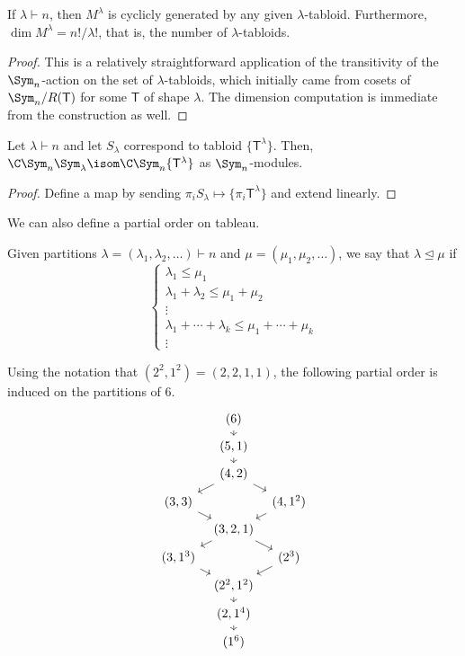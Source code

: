 \documentclass[11pt,leqno,oneside]{amsbook}
\newcommand{\partitionof}{\vdash}
\newcommand{\T}{\mathsf{T}} %
\newcommand{\dominatedby}{\trianglelefteq}
\numberwithin{thm}{section}
\begin{document}
\begin{prop}
  If \(\lambda \partitionof n\), then \(M^\lambda\) is cyclicly
  generated by any given \(\lambda\)-tabloid. Furthermore, \(\dim
  M^\lambda = n!/\lambda!\), that is, the number of \(\lambda\)-tabloids.
\end{prop}
\begin{proof}
  This is a relatively straightforward application of the
  transitivity of the \(\Sym_n\)-action on the set of
  \(\lambda\)-tabloids, which 
  initially came from cosets of \(\Sym_n/R(\T)\) for some \(\T\) of
  shape \(\lambda\). The dimension computation is immediate from the
  construction as well. 
\end{proof}
\begin{thm}
  Let \(\lambda \partitionof n\) and let \(S_\lambda\) correspond to
  tabloid \(\{\T^\lambda\}\). Then, \(\C \Sym_n \Sym_\lambda \isom \C
  \Sym_n \{\T^\lambda\}\) as \(\Sym_n\)-modules.
\end{thm}
\begin{proof}
  Define a map by sending \(\pi_i S_\lambda \mapsto \{\pi_i
  \T^\lambda\}\) and extend linearly.
\end{proof}
We can also define a partial order on
tableau.
\begin{defn}
  Given partitions \(\lambda = (\lambda_1, \lambda_2,
  \ldots) \partitionof n\) and \(\mu = (\mu_1, \mu_2, \ldots)\), we
  say that \(\lambda \dominatedby \mu\) if \[
    \begin{cases}
      \lambda_1 \leq \mu_1 \\
      \lambda_1 + \lambda_2 \leq \mu_1 + \mu_2 \\
      \vdots\\
      \lambda_1 + \cdots + \lambda_k \leq \mu_1 + \cdots + \mu_k \\
      \vdots
    \end{cases}
  \]
\end{defn}
\begin{example}
  Using the notation that \((2^2,1^2) = (2,2,1,1)\), the following
  partial order is induced on the partitions of \(6\). 
\[  \begin{tikzcd}[row sep=tiny, column sep=tiny]
    & (6) \ar[d] & \\
    & (5,1) \ar[d] & \\
    & (4,2) \ar[ld] \ar[rd] & \\
    (3,3) \ar[rd] & & (4,1^2) \ar[ld] \\
    & (3,2,1) \ar[ld] \ar[rd] & \\
    (3,1^3) \ar[rd]& & (2^3) \ar[ld] \\
    & (2^2, 1^2) \ar[d] & \\
    & (2,1^4) \ar[d] & \\
    & (1^6) &
  \end{tikzcd}
\]
\end{example}
\end{document}
